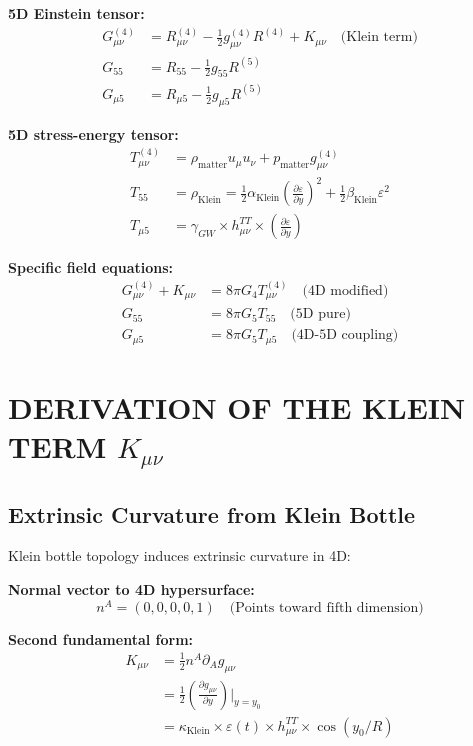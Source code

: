 \documentclass[12pt,a4paper]{article}
\begin{document}
\textbf{5D Einstein tensor:}
\begin{align}
G_{\mu\nu}^{(4)} &= R_{\mu\nu}^{(4)} - \frac{1}{2}g_{\mu\nu}^{(4)}R^{(4)} + K_{\mu\nu} \quad \text{(Klein term)}\\
G_{55} &= R_{55} - \frac{1}{2}g_{55} R^{(5)}\\
G_{\mu 5} &= R_{\mu 5} - \frac{1}{2}g_{\mu 5} R^{(5)}
\end{align}

\textbf{5D stress-energy tensor:}
\begin{align}
T_{\mu\nu}^{(4)} &= \rho_{\text{matter}} u_\mu u_\nu + p_{\text{matter}} g_{\mu\nu}^{(4)}\\
T_{55} &= \rho_{\text{Klein}} = \frac{1}{2}\alpha_{\text{Klein}}\left(\frac{\partial\varepsilon}{\partial y}\right)^2 + \frac{1}{2}\beta_{\text{Klein}} \varepsilon^2\\
T_{\mu 5} &= \gamma_{GW} \times h_{\mu\nu}^{TT} \times \left(\frac{\partial\varepsilon}{\partial y}\right)
\end{align}

\textbf{Specific field equations:}
\begin{align}
G_{\mu\nu}^{(4)} + K_{\mu\nu} &= 8\pi G_4 T_{\mu\nu}^{(4)} \quad \text{(4D modified)}\\
G_{55} &= 8\pi G_5 T_{55} \quad \text{(5D pure)}\\
G_{\mu 5} &= 8\pi G_5 T_{\mu 5} \quad \text{(4D-5D coupling)}
\end{align}

\section{DERIVATION OF THE KLEIN TERM $K_{\mu\nu}$}

\subsection{Extrinsic Curvature from Klein Bottle}

Klein bottle topology induces extrinsic curvature in 4D:

\textbf{Normal vector to 4D hypersurface:}
\begin{equation}
n^A = (0, 0, 0, 0, 1) \quad \text{(Points toward fifth dimension)}
\end{equation}

\textbf{Second fundamental form:}
\begin{align}
K_{\mu\nu} &= \frac{1}{2} n^A \partial_A g_{\mu\nu}\\
&= \frac{1}{2} \left(\frac{\partial g_{\mu\nu}}{\partial y}\right)\bigg|_{y=y_0}\\
&= \kappa_{\text{Klein}} \times \varepsilon(t) \times h_{\mu\nu}^{TT} \times \cos(y_0/R)
\end{align}
\end{document}
